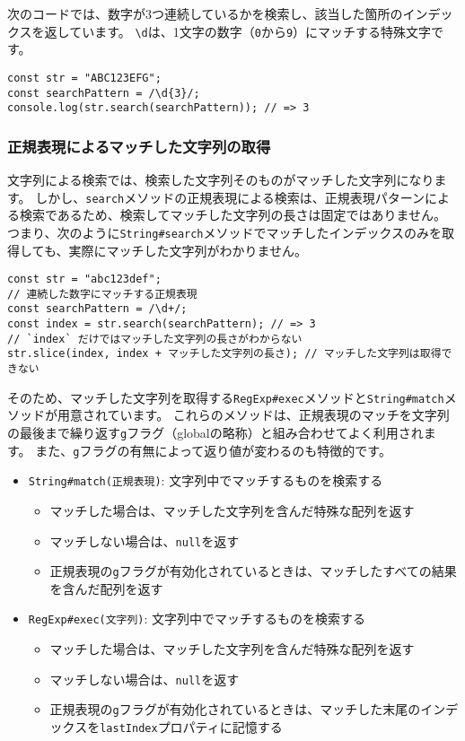 次のコードでは、数字が3つ連続しているかを検索し、該当した箇所のインデックスを返しています。
\texttt{\textbackslash d}は、1文字の数字（\texttt{0}から\texttt{9}）にマッチする特殊文字です。

\begin{lstlisting}
const str = "ABC123EFG";
const searchPattern = /\d{3}/;
console.log(str.search(searchPattern)); // => 3
\end{lstlisting}

\hypertarget{match-by-regexp}{%
\subsubsection{正規表現によるマッチした文字列の取得}\label{match-by-regexp}}

文字列による検索では、検索した文字列そのものがマッチした文字列になります。
しかし、\texttt{search}メソッドの正規表現による検索は、正規表現パターンによる検索であるため、検索してマッチした文字列の長さは固定ではありません。
つまり、次のように\texttt{String\#search}メソッドでマッチしたインデックスのみを取得しても、実際にマッチした文字列がわかりません。

\begin{lstlisting}
const str = "abc123def";
// 連続した数字にマッチする正規表現
const searchPattern = /\d+/;
const index = str.search(searchPattern); // => 3
// `index` だけではマッチした文字列の長さがわからない
str.slice(index, index + マッチした文字列の長さ); // マッチした文字列は取得できない
\end{lstlisting}

そのため、マッチした文字列を取得する\texttt{RegExp\#exec}メソッドと\texttt{String\#match}メソッドが用意されています。
これらのメソッドは、正規表現のマッチを文字列の最後まで繰り返す\texttt{g}フラグ（globalの略称）と組み合わせてよく利用されます。
また、\texttt{g}フラグの有無によって返り値が変わるのも特徴的です。

\begin{itemize}
\item
  \texttt{String\#match(正規表現)}:
  文字列中でマッチするものを検索する

  \begin{itemize}
  \item
    マッチした場合は、マッチした文字列を含んだ特殊な配列を返す
  \item
    マッチしない場合は、\texttt{null}を返す
  \item
    正規表現の\texttt{g}フラグが有効化されているときは、マッチしたすべての結果を含んだ配列を返す
  \end{itemize}
\item
  \texttt{RegExp\#exec(文字列)}:
  文字列中でマッチするものを検索する

  \begin{itemize}
  \item
    マッチした場合は、マッチした文字列を含んだ特殊な配列を返す
  \item
    マッチしない場合は、\texttt{null}を返す
  \item
    正規表現の\texttt{g}フラグが有効化されているときは、マッチした末尾のインデックスを\texttt{lastIndex}プロパティに記憶する
  \end{itemize}
\end{itemize}

